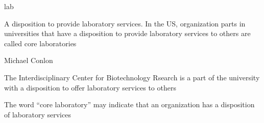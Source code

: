 \documentclass[letterpaper,10pt,english]{sphinxmanual}
\begin{document}
\begin{sphinxShadowBox}

\sphinxAtStartPar
lab
\end{sphinxShadowBox}

\begin{sphinxShadowBox}

\sphinxAtStartPar
{\hyperref[\detokenize{doc-BFO_0000016::doc}]{}}
\end{sphinxShadowBox}

\begin{sphinxShadowBox}

\sphinxAtStartPar
A disposition to provide laboratory services.  In the US, organization parts in universities that have a disposition to provide laboratory services to others are called core laboratories
\end{sphinxShadowBox}

\begin{sphinxShadowBox}

\sphinxAtStartPar
Michael Conlon 
\end{sphinxShadowBox}

\begin{sphinxShadowBox}

\sphinxAtStartPar
The Interdisciplinary Center for Biotechnology Rsearch is a part of the university with a disposition to offer laboratory services to others
\end{sphinxShadowBox}

\begin{sphinxShadowBox}

\sphinxAtStartPar
The word “core laboratory” may indicate that an organization has a disposition of laboratory services
\end{sphinxShadowBox}

\begin{sphinxShadowBox}

\sphinxAtStartPar
{}

\sphinxAtStartPar
{}

\sphinxAtStartPar
{}
\end{sphinxShadowBox}
\end{document}
